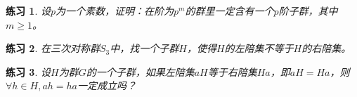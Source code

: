 \documentclass{article}
\newtheorem{Exercise}{练习}
\begin{document}
\begin{CJK*}{UTF8}{gbsn}
\begin{Exercise}
设$p$为一个素数，证明：在阶为$p^m$的群里一定含有一个$p$阶子群，其中$m\geq 1$。
\end{Exercise}

\begin{Exercise}
在三次对称群$S_3$中，找一个子群$H$，使得$H$的左陪集不等于$H$的右陪集。
\end{Exercise}
\begin{Exercise}
设$H$为群$G$的一个子群，如果左陪集$aH$等于右陪集$Ha$，即$aH=Ha$，则$\forall h\in H, ah=ha$一定成立吗？
\end{Exercise}
\end{CJK*}
\end{document}
